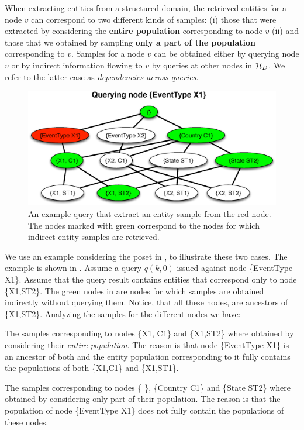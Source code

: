 When extracting entities from a structured domain, the retrieved entities for a node $v$ can correspond to two different kinds of samples: (i) those that were extracted by considering the {\bf entire population} corresponding to node $v$ (ii) and those that we obtained by sampling {\bf only a part of the population} corresponding to $v$. Samples for a node $v$ can be obtained either by querying node $v$ or by indirect information flowing to $v$ by queries at other nodes in $\mathcal{H}_D$. We refer to the latter case as {\em dependencies across queries}. 
\begin{figure}[h]
	\begin{center}
	\includegraphics[clip,scale=0.32]{figs/exampleQuery.eps}
	\caption{An example query that extract an entity sample from the red node. The nodes marked with green correspond to the nodes for which indirect entity samples are retrieved.}
	\label{fig:query}
	\end{center}
	\vspace{-10pt}
\end{figure}

We use an example considering the poset in , to illustrate these two cases. The example is shown in . Assume a query $q(k,0)$ issued against node \{EventType X1\}. Assume that the query result contains entities that correspond only to node \{X1,ST2\}. The green nodes in  are nodes for which samples are obtained indirectly without querying them. Notice, that all these nodes, are ancestors of \{X1,ST2\}. Analyzing the samples for the different nodes we have:
\squishlist
\item The samples corresponding to nodes \{X1, C1\} and \{X1,ST2\} where obtained by considering their {\em entire population}. The reason is that node \{EventType X1\} is an ancestor of both and the entity population corresponding to it fully contains the populations of both \{X1,C1\} and \{X1,ST1\}. 
\item The samples corresponding to nodes \{ \}, \{Country C1\} and \{State ST2\} where obtained by considering only part of their population. The reason is that the population of node \{EventType X1\} does not fully contain the populations of these nodes. 
\squishend

